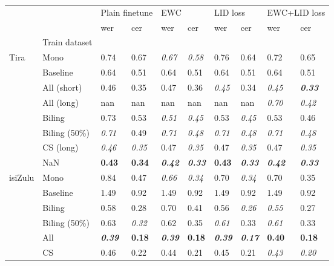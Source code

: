 \begin{tabular}{llllllllll}
\toprule
 &  & \multicolumn{2}{l}{Plain finetune} & \multicolumn{2}{l}{EWC} & \multicolumn{2}{l}{LID loss} & \multicolumn{2}{l}{EWC+LID loss} \\
 &  & wer & cer & wer & cer & wer & cer & wer & cer \\
 & Train dataset &  &  &  &  &  &  &  &  \\
\midrule
Tira & Mono & 0.74 & 0.67 & \textit{0.67} & \textit{0.58} & 0.76 & 0.64 & 0.72 & 0.65 \\
 & Baseline & 0.64 & 0.51 & 0.64 & 0.51 & 0.64 & 0.51 & 0.64 & 0.51 \\
 & All (short) & 0.46 & 0.35 & 0.47 & 0.36 & \textit{0.45} & 0.34 & \textit{0.45} & \textit{\textbf{0.33}} \\
 & All (long) & nan & nan & nan & nan & nan & nan & \textit{0.70} & \textit{0.42} \\
 & Biling & 0.73 & 0.53 & \textit{0.51} & \textit{0.45} & 0.53 & \textit{0.45} & 0.53 & 0.46 \\
 & Biling (50\%) & \textit{0.71} & 0.49 & \textit{0.71} & \textit{0.48} & \textit{0.71} & \textit{0.48} & \textit{0.71} & \textit{0.48} \\
 & CS (long) & \textit{0.46} & \textit{0.35} & 0.47 & \textit{0.35} & 0.47 & \textit{0.35} & 0.47 & \textit{0.35} \\
 & NaN & \textbf{0.43} & \textbf{0.34} & \textit{\textbf{0.42}} & \textit{\textbf{0.33}} & \textbf{0.43} & \textit{\textbf{0.33}} & \textit{\textbf{0.42}} & \textit{\textbf{0.33}} \\
\midrule
isiZulu & Mono & 0.84 & 0.47 & \textit{0.66} & \textit{0.34} & 0.70 & \textit{0.34} & 0.70 & 0.35 \\
 & Baseline & 1.49 & 0.92 & 1.49 & 0.92 & 1.49 & 0.92 & 1.49 & 0.92 \\
 & Biling & 0.58 & 0.28 & 0.70 & 0.41 & 0.56 & \textit{0.26} & \textit{0.55} & 0.27 \\
 & Biling (50\%) & 0.63 & \textit{0.32} & 0.62 & 0.35 & \textit{0.61} & 0.33 & \textit{0.61} & 0.33 \\
 & All & \textit{\textbf{0.39}} & \textbf{0.18} & \textit{\textbf{0.39}} & \textbf{0.18} & \textit{\textbf{0.39}} & \textit{\textbf{0.17}} & \textbf{0.40} & \textbf{0.18} \\
 & CS & 0.46 & 0.22 & 0.44 & 0.21 & 0.45 & 0.21 & \textit{0.43} & \textit{0.20} \\
\bottomrule
\end{tabular}

